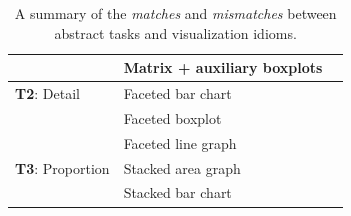 \documentclass[journal]{vgtc}                %
\newcommand*\match{\textcolor{darkGreen}{\ding{52}}}
\newcommand*\mismatch{\textcolor{red}{\ding{54}}}
\begin{document}
\begin{table}[ht]
\begin{center}
\begin{tabular}{l|l|c}
        \cellcolor{nmYellow} %
        
        & \cellcolor{nmGreen} Matrix + auxiliary boxplots 
        
        & \match
        
        \\
        
        \hline
        
        \cellcolor{nmYellow} {\bf T2}: Detail 
        
        & \cellcolor{nmGreen} Faceted bar chart 
        
        & \match
        
        \\
        
        \cellcolor{nmYellow} %
        
        & \cellcolor{nmGreen} Faceted boxplot 
        
        & \mismatch
        
        \\
        
        \cellcolor{nmYellow} %
        
        & \cellcolor{nmGreen} Faceted line graph 
        
        & \match
        
        \\
        
        \hline
        
        \cellcolor{nmYellow} {\bf T3}: Proportion 
        
        & \cellcolor{nmGreen} Stacked area graph 
        
        & \match
        
        \\
        
        \cellcolor{nmYellow} %
        
        & \cellcolor{nmGreen} Stacked bar chart 
        
        & \match
        
        \\
        
        \hline  
        
    \end{tabular}
    \vspace{-0.3cm}
    \caption{A summary of the \textsl{matches} and \textsl{mismatches} between abstract tasks and visualization idioms.}
    \label{tab:matches-mismatches}
    \end{center}
    \vspace{-0.6cm}
\end{table}
\end{document}
